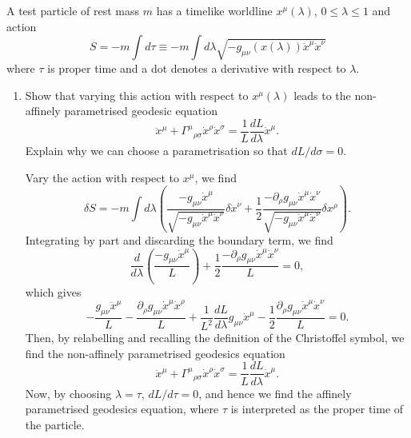 A test particle of rest mass $m$ has a timelike worldline $x^\mu(\lambda)$, $0\leq\lambda\leq 1$ and action
\begin{equation}
    S = -m\int d\tau \equiv -m\int d\lambda\sqrt{-g_{\mu\nu}(x(\lambda))\dot x^\mu\dot x^\nu}
\end{equation}
where $\tau$ is proper time and a dot denotes a derivative with respect to $\lambda$.
\begin{enumerate}[label=\roman*)]
    \item Show that varying this action with respect to $x^\mu(\lambda)$ leads to the non-affinely parametrised geodesic equation
    \begin{equation}
        \ddot x^\mu + \Gamma^\mu{}_{\rho\sigma}\dot x^\rho\dot x^\sigma = \frac{1}{L}\frac{dL}{d\lambda}\dot x^\mu.
    \end{equation}
    Explain why we can choose a parametrisation so that $dL/d\sigma = 0$.
    \begin{solution}
        Vary the action with respect to $x^\mu$, we find
        \begin{equation}
            \delta S = -m\int d\lambda\left(\frac{-g_{\mu\nu}\dot{x}^\mu}{\sqrt{-g_{\mu\nu}\dot{x}^\mu\dot{x}^\nu}}\delta\dot{x}^\nu + \frac{1}{2}\frac{-\partial_\rho g_{\mu\nu}\dot{x}^\mu\dot{x}^\nu}{\sqrt{- g_{\mu\nu}\dot{x}^\mu\dot{x}^\nu}}\delta x^\rho\right).
        \end{equation}
        Integrating by part and discarding the boundary term, we find
        \begin{equation}
            \frac{d}{d\lambda}\left(\frac{-g_{\mu\nu}\dot{x}^\mu}{L}\right) +  \frac{1}{2}\frac{-\partial_\rho g_{\mu\nu}\dot{x}^\mu\dot{x}^\nu}{L} = 0,
        \end{equation}
        which gives
        \begin{equation}
            -\frac{ g_{\mu\nu}\ddot{x}^\mu}{L} - \frac{\partial_\rho g_{\mu\nu}\dot{x}^\mu\dot{x}^\rho}{L} + \frac{1}{L^2}\frac{dL}{d\lambda}g_{\mu\nu}\dot{x}^\mu-\frac{1}{2}\frac{\partial_\rho g_{\mu\nu}\dot{x}^\mu\dot{x}^\nu}{L}   =0.     
        \end{equation}
        Then, by relabelling and recalling the definition of the Christoffel symbol, we find the non-affinely parametrised geodesics equation
        \begin{equation}
            \ddot x^\mu + \Gamma^\mu{}_{\rho\sigma}\dot x^\rho\dot x^\sigma = \frac{1}{L}\frac{dL}{d\lambda}\dot x^\mu. 
        \end{equation}
        Now, by choosing $\lambda = \tau$, $dL / d\tau = 0$, and hence we find the affinely parametrised geodesics equation, where $\tau$ is interpreted as the proper time of the particle.

\end{solution}
\end{enumerate}
